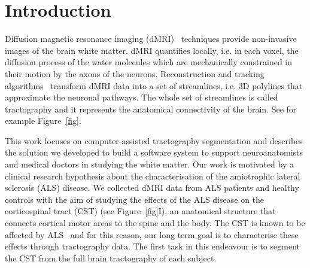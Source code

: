 \section{Introduction}
\label{sec:introduction}

Diffusion magnetic resonance imaging
(dMRI)~\cite{basser1994mr} techniques provide
non-invasive images of the brain white matter. dMRI quantifies
locally, i.e. in each voxel, the diffusion process of the water
molecules which are mechanically constrained in their motion by the
axons of the neurons. Reconstruction and tracking
algorithms~\cite{mori2002fiber} transform dMRI data into a set of
streamlines, i.e. 3D polylines that approximate the neuronal
pathways. The whole set of streamlines is called tractography and it
represents the anatomical connectivity of the brain. See for example
Figure~\ref{fig}.


This work focuses on computer-assisted tractography segmentation and
describes the solution we developed to build a software system to
support neuroanatomists and medical doctors in studying the white
matter. Our work is motivated by a clinical research hypothesis about
the characterisation of the amiotrophic lateral sclerosis (ALS)
disease. We collected dMRI data from ALS patients and healthy controls
with the aim of studying the effects of the ALS disease on the
corticospinal tract (CST) (see Figure~\ref{fig}I), an anatomical
structure that connects cortical motor areas to the spine and the
body. The CST is known to be affected by
ALS~\cite{cosottini2010evaluation} and for this
reason, our long term goal is to characterise these effects through
tractography data. The first task in this endeavour is to segment the
CST from the full brain tractography of each subject.


